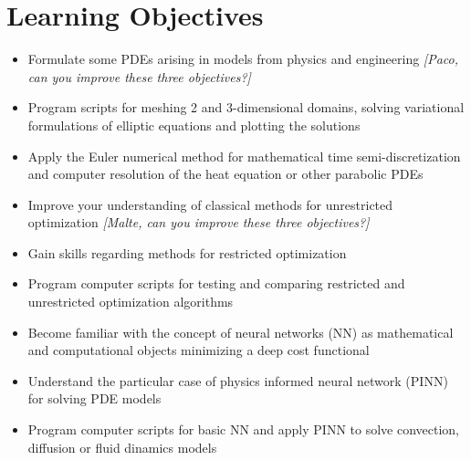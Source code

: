 \documentclass[letterpaper]{inzane_syllabus} %
\begin{document}
\vspace{0.5cm}
\section{Learning Objectives}

\begin{itemize}
  \item Formulate some PDEs arising in models from physics and engineering \emph{\color{myCOLOR} [Paco, can you improve these three objectives?]}
  \item Program 
    scripts for meshing 2 and 3-dimensional domains, solving variational formulations of elliptic equations and plotting the solutions
  \item Apply the Euler numerical method for mathematical time semi-discretization and computer resolution of the heat equation or other parabolic PDEs
  \item Improve your understanding of classical methods for unrestricted optimization \emph{\color{myCOLOR} [Malte, can you improve these three objectives?]}
  \item Gain skills regarding methods for restricted optimization 
  \item Program computer scripts for testing and comparing restricted and unrestricted optimization algorithms 
  \item Become familiar with the concept of  neural networks (NN) as mathematical and computational objects minimizing a deep cost functional
  \item Understand the particular case of physics informed neural network (PINN) for solving PDE models
  \item Program computer scripts for basic NN and apply PINN to solve convection, diffusion or fluid dinamics models

\end{itemize}
\end{document}
